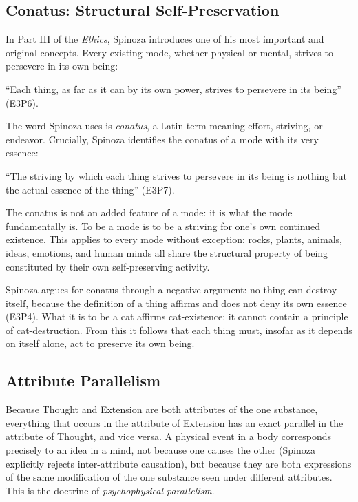 \documentclass[12pt]{article}
\begin{document}
\subsection{Conatus: Structural Self-Preservation}\label{conatus-structural-self-preservation}

In Part III of the \emph{Ethics}, Spinoza introduces one of his most
important and original concepts. Every existing mode, whether physical
or mental, strives to persevere in its own being:

``Each thing, as far as it can by its own power, strives to persevere in
its being'' (E3P6).

The word Spinoza uses is \emph{conatus}, a Latin term meaning effort,
striving, or endeavor. Crucially, Spinoza identifies the conatus of a
mode with its very essence:

``The striving by which each thing strives to persevere in its being is
nothing but the actual essence of the thing'' (E3P7).

The conatus is not an added feature of a mode: it is what the mode
fundamentally is. To be a mode is to be a striving for one's own
continued existence. This applies to every mode without exception:
rocks, plants, animals, ideas, emotions, and human minds all share the
structural property of being constituted by their own self-preserving
activity.

Spinoza argues for conatus through a negative argument: no thing can
destroy itself, because the definition of a thing affirms and does not
deny its own essence (E3P4). What it is to be a cat affirms
cat-existence; it cannot contain a principle of cat-destruction. From
this it follows that each thing must, insofar as it depends on itself
alone, act to preserve its own being.

\subsection{Attribute Parallelism}\label{attribute-parallelism}

Because Thought and Extension are both attributes of the one substance,
everything that occurs in the attribute of Extension has an exact
parallel in the attribute of Thought, and vice versa. A physical event
in a body corresponds precisely to an idea in a mind, not because one
causes the other (Spinoza explicitly rejects inter-attribute causation),
but because they are both expressions of the same modification of the
one substance seen under different attributes. This is the doctrine of
\emph{psychophysical parallelism}.
\end{document}
